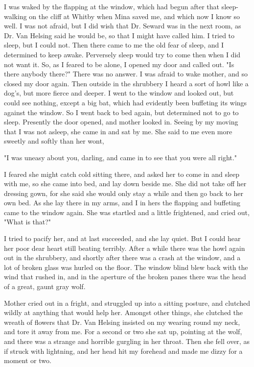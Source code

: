 I was waked by the flapping at the window, which had begun after that sleep-walking on the cliff at Whitby when Mina saved me, and which now I know so well. I was not afraid, but I did wish that Dr. Seward was in the next room, as Dr. Van Helsing said he would be, so that I might have called him. I tried to sleep, but I could not. Then there came to me the old fear of sleep, and I determined to keep awake. Perversely sleep would try to come then when I did not want it. So, as I feared to be alone, I opened my door and called out. "Is there anybody there?" There was no answer. I was afraid to wake mother, and so closed my door again. Then outside in the shrubbery I heard a sort of howl like a dog's, but more fierce and deeper. I went to the window and looked out, but could see nothing, except a big bat, which had evidently been buffeting its wings against the window. So I went back to bed again, but determined not to go to sleep. Presently the door opened, and mother looked in. Seeing by my moving that I was not asleep, she came in and sat by me. She said to me even more sweetly and softly than her wont, 

"I was uneasy about you, darling, and came in to see that you were all right." 

I feared she might catch cold sitting there, and asked her to come in and sleep with me, so she came into bed, and lay down beside me. She did not take off her dressing gown, for she said she would only stay a while and then go back to her own bed. As she lay there in my arms, and I in hers the flapping and buffeting came to the window again. She was startled and a little frightened, and cried out, "What is that?" 

I tried to pacify her, and at last succeeded, and she lay quiet. But I could hear her poor dear heart still beating terribly. After a while there was the howl again out in the shrubbery, and shortly after there was a crash at the window, and a lot of broken glass was hurled on the floor. The window blind blew back with the wind that rushed in, and in the aperture of the broken panes there was the head of a great, gaunt gray wolf. 

Mother cried out in a fright, and struggled up into a sitting posture, and clutched wildly at anything that would help her. Amongst other things, she clutched the wreath of flowers that Dr. Van Helsing insisted on my wearing round my neck, and tore it away from me. For a second or two she sat up, pointing at the wolf, and there was a strange and horrible gurgling in her throat. Then she fell over, as if struck with lightning, and her head hit my forehead and made me dizzy for a moment or two. 

